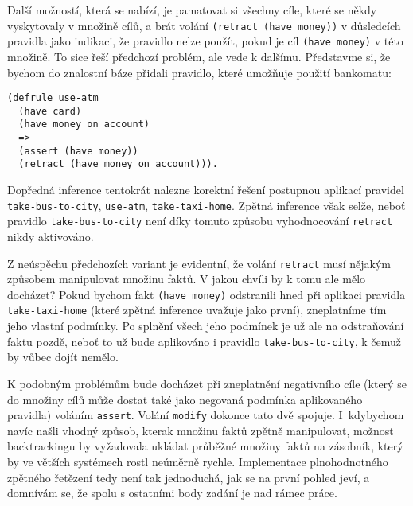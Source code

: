 Další možností, která se nabízí, je pamatovat si všechny cíle, které se někdy
vyskytovaly v množině cílů, a brát volání \verb|(retract (have money))| v
důsledcích pravidla jako indikaci, že pravidlo nelze použít, pokud je cíl
\verb|(have money)| v této množině. To sice řeší předchozí problém, ale vede k
dalšímu. Představme si, že bychom do znalostní báze přidali pravidlo, které
umožňuje použití bankomatu:
\begin{verbatim}
(defrule use-atm
  (have card)
  (have money on account)
  =>
  (assert (have money))
  (retract (have money on account))).
\end{verbatim}
Dopředná inference tentokrát nalezne korektní řešení postupnou aplikací pravidel
\verb|take-bus-to-city|, \verb|use-atm|, \verb|take-taxi-home|. Zpětná inference
však selže, neboť pravidlo \verb|take-bus-to-city| není díky tomuto způsobu
vyhodnocování \verb|retract| nikdy aktivováno.

Z neúspěchu předchozích variant je evidentní, že volání \verb|retract| musí
nějakým způsobem manipulovat množinu faktů. V jakou chvíli by k tomu ale mělo
docházet? Pokud bychom fakt \verb|(have money)| odstranili hned při aplikaci
pravidla \verb|take-taxi-home| (které zpětná inference uvažuje jako první),
zneplatníme tím jeho vlastní podmínky. Po splnění všech jeho podmínek je už ale
na odstraňování faktu pozdě, neboť to už bude aplikováno i pravidlo
\verb|take-bus-to-city|, k čemuž by vůbec dojít nemělo.

K podobným problémům bude docházet při zneplatnění negativního cíle (který se do
množiny cílů může dostat také jako negovaná podmínka aplikovaného pravidla) voláním
\verb|assert|. Volání \verb|modify| dokonce tato dvě spojuje. I~kdybychom navíc
našli vhodný způsob, kterak množinu faktů zpětně manipulovat, možnost
backtrackingu by vyžadovala ukládat průběžné množiny faktů na zásobník, který by
ve větších systémech rostl neúměrně rychle. Implementace plnohodnotného zpětného
řetězení tedy není tak jednoduchá, jak se na první pohled jeví, a domnívám se, že
spolu s ostatními body zadání je nad rámec práce.
